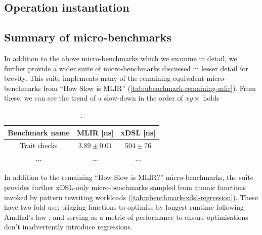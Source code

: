 

\subsection{Operation instantiation}

\subsection{Summary of micro-benchmarks}

In addition to the above micro-benchmarks which we examine in detail, we further provide a wider suite of micro-benchmarks discussed in lesser detail for brevity. %
This suite implements many of the remaining equivalent micro-benchmarks from ``How Slow is MLIR'' (\autoref{tab:ubenchmark-remaining-mlir}).
From these, we can see the trend of a slow-down in the order of $xy\times$ holds

\begin{table}[H]
  \caption{.}
  \label{tab:ubenchmark-remaining-mlir}
  \centering
  \begin{tabular}{ccc}
    \toprule
    \textbf{Benchmark name} & \textbf{MLIR [ns]} & \textbf{xDSL [ns]}\\
    \midrule
    Trait checks & $3.89 \pm 0.01$ & $504 \pm 76$ \\
    ... & ... & ... \\
    \bottomrule
  \end{tabular}
\end{table}


In addition to the remaining ``How Slow is MLIR?'' micro-benchmarks, the suite provides further xDSL-only micro-benchmarks sampled from atomic functions invoked by pattern rewriting workloads (\autoref{tab:ubenchmark-xdsl-regression}).
These have two-fold use: triaging functions to optimise by longest runtime following Amdhal's law \cite{amdahlValiditySingleProcessor1967}; and serving as a metric of performance to ensure optimisations don't inadvertently introduce regressions.


